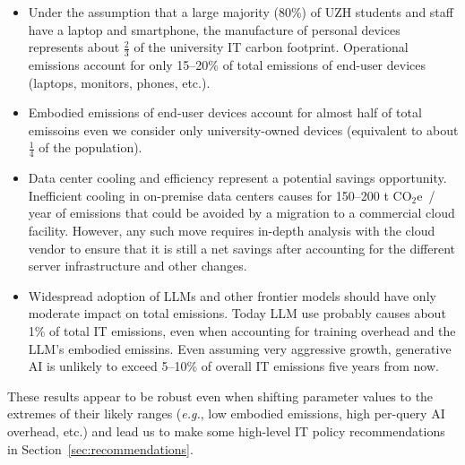 \documentclass[11pt]{article}
\newcommand{\eg}{{\em e.g.}}
\newcommand{\coe}{CO$_2$e}
\begin{document}
\begin{itemize}

  \item Under the assumption that a large majority (80\%) of UZH students and staff have a laptop and smartphone, the manufacture of personal devices represents about $\frac{2}{3}$ of the university IT carbon footprint. Operational emissions account for only 15--20\% of total emissions of end-user devices (laptops, monitors, phones, etc.).

  \item Embodied emissions of end-user devices account for almost half of total emissoins even we consider only university-owned devices (equivalent to about $\frac{1}{4}$ of the population).

  \item Data center cooling and efficiency represent a potential savings opportunity. Inefficient cooling in on-premise data centers causes for 150--200 t \coe\ / year of emissions that could be avoided by a migration to a commercial cloud facility. However, any such move requires in-depth analysis with the cloud vendor to ensure that it is still a net savings after accounting for the different server infrastructure and other changes.

  \item Widespread adoption of LLMs and other frontier models should have only moderate impact on total emissions. Today LLM use probably causes about 1\% of total IT emissions, even when accounting for training overhead and the LLM's embodied emissins. Even assuming very aggressive growth, generative AI is unlikely to exceed 5--10\% of overall IT emissions five years from now.

\end{itemize}

These results appear to be robust even when shifting parameter values to the extremes of their likely ranges (\eg, low embodied emissions, high per-query AI overhead, etc.) and lead us to make some high-level IT policy recommendations in Section~\ref{sec:recommendations}.

\printbibliography
\end{document}
